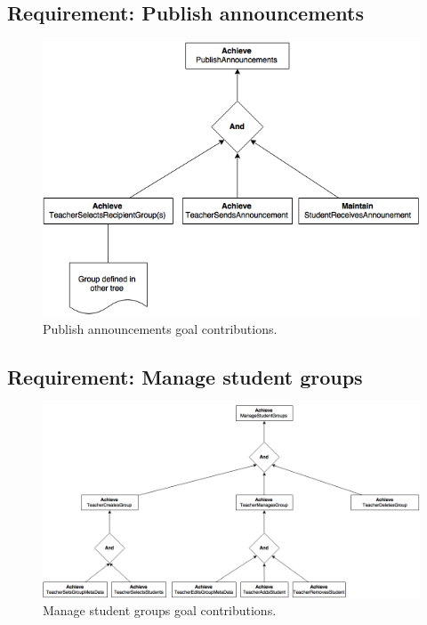\clearpage
\subsection{Requirement: Publish announcements}
\begin{figure}[h!]
	\centering
	\includegraphics[width=1\linewidth]{images/PublishAnnouncements.png}
	\caption{Publish announcements goal contributions.}
	\label{fig:goal_publish_announcements}
\end{figure}

\clearpage
\subsection{Requirement: Manage student groups}
\begin{figure}[h!]
	\centering
	\includegraphics[width=1\linewidth]{images/ManageStudentGroups.png}
	\caption{Manage student groups goal contributions.}
	\label{fig:goal_manage_student_groups}
\end{figure}

